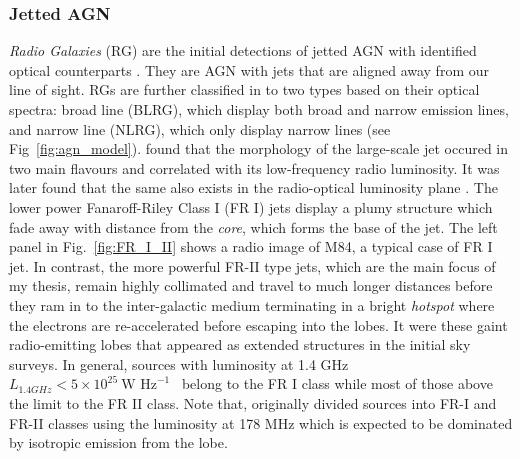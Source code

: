\subsubsection{Jetted AGN\label{subsec:jetted_agn}}
\textit{Radio Galaxies} (RG) are the initial detections of jetted AGN with identified optical counterparts \citep[e.g.,][]{1954ApJ...119..215B}. They are AGN with jets that are aligned away from our line of sight. RGs are further classified in to two types based on their optical spectra: broad line (BLRG), which display both broad and narrow emission lines, and narrow line (NLRG), which only display narrow lines  (see Fig~\ref{fig:agn_model}).  \citet{fanaroff1974morphology} found that the morphology of the large-scale jet occured in two main flavours and correlated with its low-frequency radio luminosity. It was later found that the same also exists in the radio-optical luminosity plane \citep{owen1994fri}. The lower power Fanaroff-Riley Class I (FR I) jets display a plumy structure which fade away with distance from the \textit{core}, which forms the base of the jet. The left panel in Fig.~\ref{fig:FR_I_II} shows a radio image of M84, a typical case of FR I jet. In contrast, the more powerful FR-II type jets, which are the main focus of my thesis, remain highly collimated and travel to much longer distances before they ram in to the inter-galactic medium terminating in a bright \textit{hotspot} where the electrons are re-accelerated before escaping into the lobes. It were these gaint radio-emitting lobes that appeared as extended structures in the initial sky surveys. In general, sources with luminosity at 1.4 GHz $L_{1.4GHz}<5\times10^{25}~\textrm{W Hz}^{-1}$~
belong to the FR I class while most of those above the limit to the FR II class. Note that, \citet{fanaroff1974morphology}originally divided sources into FR-I and FR-II classes using the luminosity at 178 MHz which is expected to be dominated by isotropic emission from the lobe.
